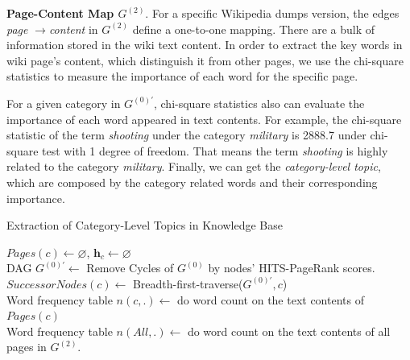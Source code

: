 \documentclass[runningheads,a4paper]{llncs}
\theoremstyle{exampstyle}
\begin{document}
\textbf{Page-Content Map \(G^{(2)}\)}. 
For a specific Wikipedia dumps version, the edges  \textit{page} \(\rightarrow\)\textit{content} in \(G^{(2)}\) define a one-to-one mapping.
There are a bulk of information stored in the wiki text content.
In order to extract the key words in wiki page's content, which distinguish it from other pages, we use the chi-square statistics\cite{yang1997comparative}\cite{liu2009imbalanced} to measure the importance of each word for the specific page.

For a given category in \(G^{(0)'}\), chi-square statistics also can evaluate the importance of each word appeared in text contents. 
For example, the chi-square statistic of the term \textit{shooting} under the category \textit{military} is 2888.7 under chi-square test with 1 degree of freedom.
That means the term \textit{shooting} is highly related to the category \textit{military}.  
Finally, we can get the \textit{category-level topic}, which are  composed by the category related words and their corresponding importance.
\setlength{\textfloatsep}{3pt}%
\begin{algorithm}[h]
\scriptsize
\caption{Extraction of Category-Level Topics in Knowledge Base}
\label{alg:normalStatesInit}

\(Pages(c)\leftarrow \varnothing\), \(\bm{h}_c \leftarrow \varnothing\)\\
DAG \(G^{(0)'} \leftarrow\) Remove Cycles of \(G^{(0)}\) by nodes' HITS-PageRank scores. \label{alg:line2inNormalStatesInit}\\
\(SuccessorNodes(c) \leftarrow \) Breadth-first-traverse(\(G^{(0)'},c\))\label{alg:line3inNormalStatesInit}\\
Word frequency table \(n(c,.) \leftarrow \) do word count on the text contents of \(Pages(c)\) \\
Word frequency table \(n(All,.) \leftarrow \) do word count on the text contents of all pages in \(G^{(2)}\).\\
\end{algorithm}
\end{document}
